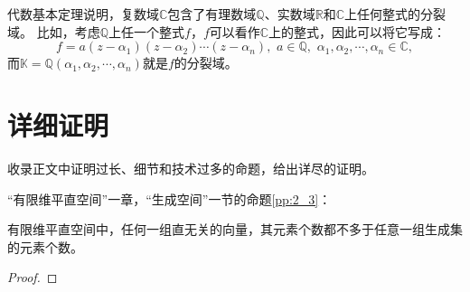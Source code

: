 \documentclass[12pt,UTF8,fontset=none]{ctexbook}
\begin{document}
\begin{appendix}
代数基本定理说明，复数域$\mathbb{C}$包含了有理数域$\mathbb{Q}$、实数域$\mathbb{R}$和$\mathbb{C}$上任何整式的分裂域。
比如，考虑$\mathbb{Q}$上任一个整式$f$，$f$可以看作$\mathbb{C}$上的整式，因此可以将它写成：
$$ f = a(z - \alpha_1)(z - \alpha_2)\cdots(z - \alpha_n), \,\, a \in \mathbb{Q}, \,\, \alpha_1, \alpha_2, \cdots ,  \alpha_n \in \mathbb{C}, $$
而$\mathbb{K} = \mathbb{Q}(\alpha_1, \alpha_2, \cdots , \alpha_n)$就是$f$的分裂域。

\chapter{详细证明}

收录正文中证明过长、细节和技术过多的命题，给出详尽的证明。

“有限维平直空间”一章，“生成空间”一节的命题\ref{pp:2_3}：
\begin{pp}\label{c-10}
    有限维平直空间中，任何一组直无关的向量，其元素个数都不多于任意一组生成集的元素个数。
\end{pp}
\begin{proof} %


\end{proof}
\end{appendix}
\end{document}
